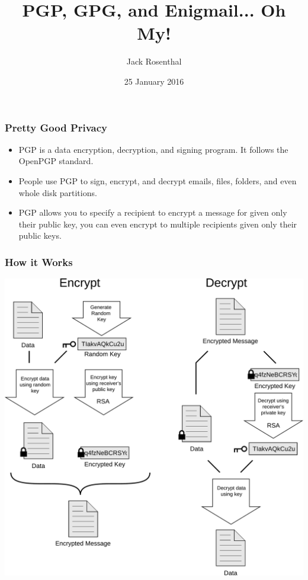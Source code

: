 \documentclass{beamer}
\title{PGP, GPG, and Enigmail... Oh My!}
\author{Jack Rosenthal}
\date{25 January 2016}
\begin{document}
\begin{frame}
    \maketitle
\end{frame}
\logo{}

\begin{frame}
    \frametitle{Pretty Good Privacy}
    \begin{itemize}[<+->]
        \item PGP is a data encryption, decryption, and signing program. It
            follows the OpenPGP standard.
        \item People use PGP to sign, encrypt, and decrypt emails, files,
            folders, and even whole disk partitions.
        \item PGP allows you to specify a recipient to encrypt a message for
            given only their public key, you can even encrypt to multiple
            recipients given only their public keys.
    \end{itemize}
\end{frame}

\begin{frame}
    \frametitle{How it Works}
    \begin{center}
        \includegraphics[width=0.7\linewidth]{graphics/PGP_diagram.pdf}
    \end{center}
\end{frame}
\end{document}
